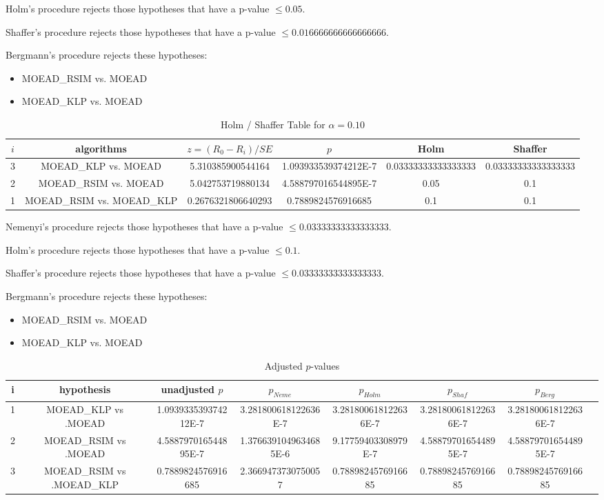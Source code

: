 \documentclass[a4paper,10pt]{article}
\begin{document}
\begin{landscape}
Holm's procedure rejects those hypotheses that have a p-value $\le0.05$.


Shaffer's procedure rejects those hypotheses that have a p-value $\le0.016666666666666666$.


Bergmann's procedure rejects these hypotheses:


\begin{itemize}


\item MOEAD_RSIM vs. MOEAD
\item MOEAD_KLP vs. MOEAD
\end{itemize}


\begin{table}[!htp]
\centering\tiny
\caption{Holm / Shaffer Table for $\alpha=0.10$}
\begin{tabular}{cccccc}
$i$&algorithms&$z=(R_0 - R_i)/SE$&$p$&Holm&Shaffer\\
\hline
3&MOEAD_KLP vs. MOEAD&5.310385900544164&1.093933539374212E-7&0.03333333333333333&0.03333333333333333\\
2&MOEAD_RSIM vs. MOEAD&5.042753719880134&4.588797016544895E-7&0.05&0.1\\
1&MOEAD_RSIM vs. MOEAD_KLP&0.2676321806640293&0.7889824576916685&0.1&0.1\\
\hline
\end{tabular}
\end{table}
Nemenyi's procedure rejects those hypotheses that have a p-value $\le0.03333333333333333$.


Holm's procedure rejects those hypotheses that have a p-value $\le0.1$.


Shaffer's procedure rejects those hypotheses that have a p-value $\le0.03333333333333333$.


Bergmann's procedure rejects these hypotheses:


\begin{itemize}


\item MOEAD_RSIM vs. MOEAD
\item MOEAD_KLP vs. MOEAD
\end{itemize}


\begin{table}[!htp]
\centering\tiny
\caption{Adjusted $p$-values}
\begin{tabular}{cccccccc}
i&hypothesis&unadjusted $p$&$p_{Neme}$&$p_{Holm}$&$p_{Shaf}$&$p_{Berg}$\\
\hline
1&MOEAD_KLP vs .MOEAD&1.093933539374212E-7&3.281800618122636E-7&3.281800618122636E-7&3.281800618122636E-7&3.281800618122636E-7\\
2&MOEAD_RSIM vs .MOEAD&4.588797016544895E-7&1.3766391049634685E-6&9.17759403308979E-7&4.588797016544895E-7&4.588797016544895E-7\\
3&MOEAD_RSIM vs .MOEAD_KLP&0.7889824576916685&2.3669473730750057&0.7889824576916685&0.7889824576916685&0.7889824576916685\\
\hline
\end{tabular}
\end{table}

\end{landscape}
\end{document}
